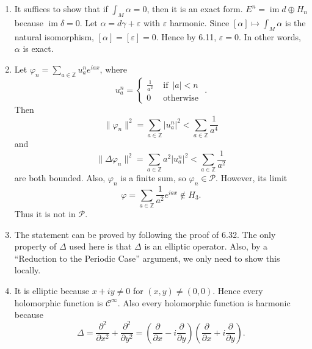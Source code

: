 \begin{enumerate}
$(\Leftarrow)$ If $u \in H_{-\infty}$, there exists $s<0$ such that $u \in H_{s}$. Then
\begin{align*}
|l(\varphi)| & =|\langle u, \varphi\rangle_{0}| \leq \|u\|_{s}\|\varphi\|_{-s} \\
& \leq \text{const} \sqrt{\sum_{[\alpha] \leq -s}\|D^{\alpha} \varphi\|^{2}} \\
& \leq \text{const} \sqrt{\sum_{[\alpha] \leq -s}\|D^{\alpha} \varphi\|_{\infty}^{2}} \\
& \leq \text{const} \sum_{[\alpha] \leq -s}\|D^{\alpha} \varphi\|_{\infty}
\end{align*}
as desired.
\item It suffices to show that if $\int_{M} \alpha=0$, then it is an exact form. 
$E^{n}=\operatorname{im} d \oplus H_{n}$ because $\operatorname{im} \delta=0$. 
Let $\alpha=d \gamma+\varepsilon$ with $\varepsilon$ harmonic. 
Since $[\alpha] \mapsto \int_{M} \alpha$ is the natural isomorphism, $[\alpha]=[\varepsilon]=0$. 
Hence by 6.11, $\varepsilon=0$. In other words, $\alpha$ is exact.
\item Let $\displaystyle\varphi_{n}=\sum_{a \in \mathbb{Z}} u_{a}^{n} e^{i a x}$, where
\[u_{a}^{n}=\begin{cases}\frac{1}{a^{2}} & \text { if }\,|a|<n \\ 0 & \text { otherwise }\end{cases}.\]
Then \[\|\varphi_{n}\|^{2}=\sum_{a \in \mathbb{Z}}|u_{a}^{n}|^{2}<\sum_{a \in \mathbb{Z}} \frac{1}{a^{4}}\]
and \[\|\Delta \varphi_{n}\|^{2}=\sum_{a \in \mathbb{Z}} a^{2}|u_{a}^{n}|^{2}<\sum_{a \in \mathbb{Z}} \frac{1}{a^{2}}\]
are both bounded. Also, $\varphi_{n}$ is a finite sum, so $\varphi_{n} \in \mathcal{P}$. 
However, its limit
\[\varphi=\sum_{a \in \mathbb{Z}} \frac{1}{a^{2}} e^{i a x} \notin H_{3}.\]
Thus it is not in $\mathcal{P}$.
\item The statement can be proved by following the proof of 6.32. 
The only property of $\Delta$ used here is that $\Delta$ is an elliptic operator. 
Also, by a ``Reduction to the Periodic Case'' argument, we only need to show this locally.
\item It is elliptic because $x+i y \neq 0$ for $(x, y) \neq(0,0)$. 
Hence every holomorphic function is $\mathcal{C}^{\infty}$. 
Also every holomorphic function is harmonic because
\[\Delta=\frac{\partial^{2}}{\partial x^{2}}+\frac{\partial^{2}}{\partial y^{2}}
=\left(\frac{\partial}{\partial x}-i \frac{\partial}{\partial y}\right)\left(\frac{\partial}{\partial x}+i \frac{\partial}{\partial y}\right).\]

\end{enumerate}
